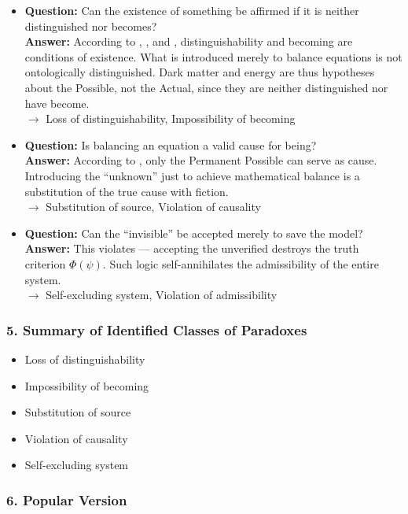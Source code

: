 \documentclass[12pt]{article}
\begin{document}
\begin{itemize}
\item \textbf{Question:} Can the existence of something be affirmed if it is neither distinguished nor becomes?\\
\textbf{Answer:} According to \text{[5]}, \text{[7]}, and \text{[9]}, distinguishability and becoming are conditions of existence. What is introduced merely to balance equations is not ontologically distinguished. Dark matter and energy are thus hypotheses about the Possible, not the Actual, since they are neither distinguished nor have become.\\
$\rightarrow$ Loss of distinguishability, Impossibility of becoming

\item \textbf{Question:} Is balancing an equation a valid cause for being?\\
\textbf{Answer:} According to \text{[6]}, only the Permanent Possible can serve as cause. Introducing the ``unknown'' just to achieve mathematical balance is a substitution of the true cause with fiction.\\
$\rightarrow$ Substitution of source, Violation of causality

\item \textbf{Question:} Can the ``invisible'' be accepted merely to save the model?\\
\textbf{Answer:} This violates \text{[11.1.1.1]} — accepting the unverified destroys the truth criterion $\Phi(\psi)$. Such logic self-annihilates the admissibility of the entire system.\\
$\rightarrow$ Self-excluding system, Violation of admissibility
\end{itemize}

\subsubsection*{5. Summary of Identified Classes of Paradoxes}

\begin{itemize}
\item Loss of distinguishability
\item Impossibility of becoming
\item Substitution of source
\item Violation of causality
\item Self-excluding system
\end{itemize}

\subsubsection*{6. Popular Version}
\end{document}
